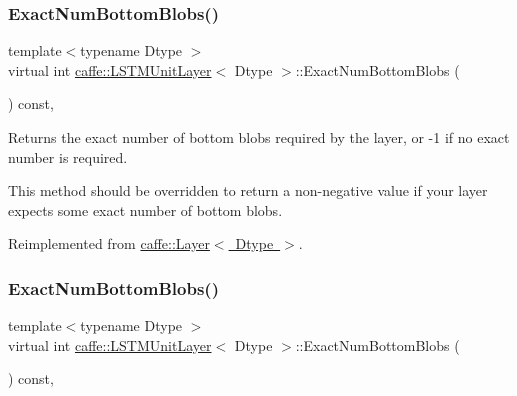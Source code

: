 \subsubsection{\texorpdfstring{Exact\+Num\+Bottom\+Blobs()}{ExactNumBottomBlobs()}\hspace{0.1cm}{\footnotesize\ttfamily [1/2]}}
{\footnotesize\ttfamily template$<$typename Dtype $>$ \\
virtual int \mbox{\hyperlink{classcaffe_1_1_l_s_t_m_unit_layer}{caffe\+::\+L\+S\+T\+M\+Unit\+Layer}}$<$ Dtype $>$\+::Exact\+Num\+Bottom\+Blobs (\begin{DoxyParamCaption}{ }\end{DoxyParamCaption}) const\hspace{0.3cm}{\ttfamily [inline]}, {\ttfamily [virtual]}}



Returns the exact number of bottom blobs required by the layer, or -\/1 if no exact number is required. 

This method should be overridden to return a non-\/negative value if your layer expects some exact number of bottom blobs. 

Reimplemented from \mbox{\hyperlink{classcaffe_1_1_layer_a8e5ee0494d85f5f55fc4396537cbc60f}{caffe\+::\+Layer$<$ Dtype $>$}}.

\mbox{\label{classcaffe_1_1_l_s_t_m_unit_layer_a087f5f5b0e6c50d98e7a7d04aa35f1b9}} 
\subsubsection{\texorpdfstring{Exact\+Num\+Bottom\+Blobs()}{ExactNumBottomBlobs()}\hspace{0.1cm}{\footnotesize\ttfamily [2/2]}}
{\footnotesize\ttfamily template$<$typename Dtype $>$ \\
virtual int \mbox{\hyperlink{classcaffe_1_1_l_s_t_m_unit_layer}{caffe\+::\+L\+S\+T\+M\+Unit\+Layer}}$<$ Dtype $>$\+::Exact\+Num\+Bottom\+Blobs (\begin{DoxyParamCaption}{ }\end{DoxyParamCaption}) const\hspace{0.3cm}{\ttfamily [inline]}, {\ttfamily [virtual]}}



